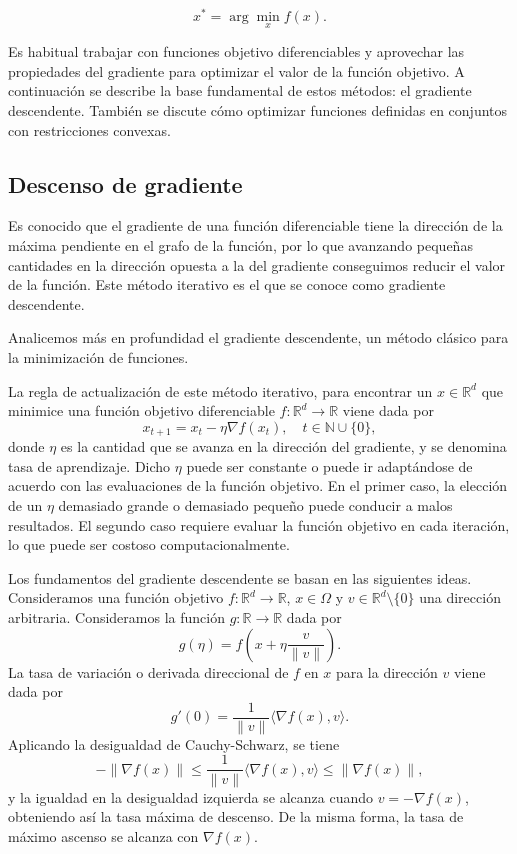 \[
x^* = \arg\min_x f(x).
\]

Es habitual trabajar con funciones objetivo diferenciables y aprovechar las propiedades del gradiente para optimizar el valor de la función objetivo. A continuación se describe la base fundamental de estos métodos: el gradiente descendente. También se discute cómo optimizar funciones definidas en conjuntos con restricciones convexas.

\subsection{Descenso de gradiente}
Es conocido que el gradiente de una función diferenciable tiene la dirección de la máxima pendiente en el grafo de la función, por lo que avanzando pequeñas cantidades en la dirección opuesta a la del gradiente conseguimos reducir el valor de la función. Este método iterativo es el que se conoce como gradiente descendente.

Analicemos más en profundidad el gradiente descendente, un método clásico para la minimización de funciones. 

La regla de actualización de este método iterativo, para encontrar un $x \in \mathbb{R}^d$ que minimice una función objetivo diferenciable $f : \mathbb{R}^d \to \mathbb{R}$ viene dada por 
\[
x_{t+1} = x_t - \eta \nabla f(x_t), \quad t \in \mathbb{N} \cup \{0\},
\]
donde $\eta$ es la cantidad que se avanza en la dirección del gradiente, y se denomina tasa de aprendizaje. Dicho $\eta$ puede ser constante o puede ir adaptándose de acuerdo con las evaluaciones de la función objetivo. En el primer caso, la elección de un $\eta$ demasiado grande o demasiado pequeño puede conducir a malos resultados. El segundo caso requiere evaluar la función objetivo en cada iteración, lo que puede ser costoso computacionalmente.

\vspace{0.3cm}

Los fundamentos del gradiente descendente se basan en las siguientes ideas. Consideramos una función objetivo $f : \mathbb{R}^d \to \mathbb{R}$, $x \in \Omega$ y $v \in \mathbb{R}^d \setminus \{0\}$ una dirección arbitraria. Consideramos la función $g: \mathbb{R} \to \mathbb{R}$ dada por 
\[
g(\eta) = f(x + \eta \frac{v}{\|v\|}).
\]
La tasa de variación o derivada direccional de $f$ en $x$ para la dirección $v$ viene dada por 
\[
g'(0) = \frac{1}{\|v\|} \langle \nabla f(x), v \rangle.
\]
Aplicando la desigualdad de Cauchy-Schwarz, se tiene
\[
- \|\nabla f(x)\| \leq \frac{1}{\|v\|} \langle \nabla f(x), v \rangle \leq \|\nabla f(x)\|,
\]
y la igualdad en la desigualdad izquierda se alcanza cuando $v = -\nabla f(x)$, obteniendo así la tasa máxima de descenso. De la misma forma, la tasa de máximo ascenso se alcanza con $\nabla f(x)$.

